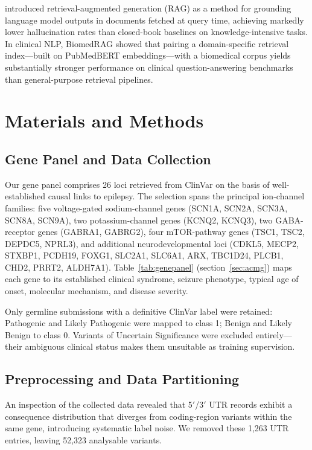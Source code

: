 \documentclass[12pt,a4paper]{article}
\begin{document}
\citet{lewis2020rag} introduced retrieval-augmented generation
(RAG) as a method for grounding language model outputs in documents
fetched at query time, achieving markedly lower hallucination rates
than closed-book baselines on knowledge-intensive tasks. In
clinical NLP, BiomedRAG \citep{biomedrag2024} showed that pairing
a domain-specific retrieval index---built on PubMedBERT
\citep{pubmedbert2021} embeddings---with a biomedical corpus yields
substantially stronger performance on clinical question-answering
benchmarks than general-purpose retrieval pipelines.

\section{Materials and Methods}

\subsection{Gene Panel and Data Collection}

Our gene panel comprises 26 loci retrieved from ClinVar
\citep{clinvar2018} on the basis of well-established causal links
to epilepsy. The selection spans the principal ion-channel
families: five voltage-gated sodium-channel genes (SCN1A, SCN2A,
SCN3A, SCN8A, SCN9A), two potassium-channel genes (KCNQ2, KCNQ3),
two GABA-receptor genes (GABRA1, GABRG2), four mTOR-pathway genes
(TSC1, TSC2, DEPDC5, NPRL3), and additional neurodevelopmental loci
(CDKL5, MECP2, STXBP1, PCDH19, FOXG1, SLC2A1, SLC6A1,
ARX, TBC1D24, PLCB1, CHD2, PRRT2, ALDH7A1).
Table~\ref{tab:genepanel} (section~\ref{sec:acmg}) maps each gene
to its established clinical syndrome, seizure phenotype, typical
age of onset, molecular mechanism, and disease severity.

Only germline submissions with a definitive ClinVar label were
retained: Pathogenic and Likely Pathogenic were mapped to class 1;
Benign and Likely Benign to class 0. Variants of Uncertain
Significance were excluded entirely---their ambiguous clinical
status makes them unsuitable as training supervision.

\subsection{Preprocessing and Data Partitioning}

An inspection of the collected data revealed that 5$'$/3$'$ UTR
records exhibit a consequence distribution that diverges from
coding-region variants within the same gene, introducing
systematic label noise. We removed these 1,263 UTR entries,
leaving 52,323 analysable variants.
\end{document}
